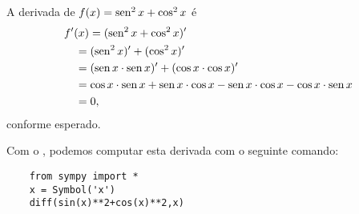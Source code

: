 \begin{ex}
  A derivada de $f(x) = \operatorname{sen}^2 x + \cos^2 x$ é
  \begin{align}
    & f'(x) = (\operatorname{sen}^2x + \cos^2 x)' \\
    & \text{}\quad = (\operatorname{sen}^2 x)' + (\cos^2 x)' \\
    & \text{}\quad = (\operatorname{sen} x\cdot \operatorname{sen} x)' + (\cos x\cdot \cos x)' \\
    & \text{}\quad = \cos x\cdot \operatorname{sen} x + \operatorname{sen} x\cdot\cos x -\operatorname{sen} x\cdot \cos x - \cos x\cdot\operatorname{sen} x\\
    & \text{}\quad = 0,
  \end{align}
  conforme esperado.

  \ifispython
  Com o \sympy, podemos computar esta derivada com o seguinte comando:
\begin{lstlisting}
    from sympy import *
    x = Symbol('x')
    diff(sin(x)**2+cos(x)**2,x)
  \end{lstlisting}
  \fi
\end{ex}

